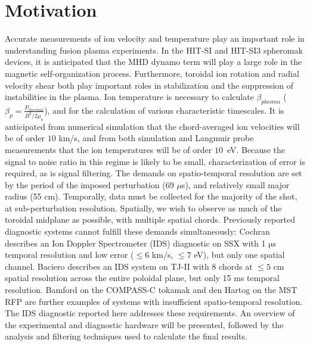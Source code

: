 \section{Motivation}
\hspace{4ex}Accurate measurements of ion velocity and temperature play an important role in understanding fusion plasma experiments. In the HIT-SI and HIT-SI3 spheromak devices, it is anticipated that the MHD dynamo term will play a large role in the magnetic self-organization process. Furthermore, toroidal ion rotation and radial velocity shear both play important roles in stabilization and the suppression of instabilities in the plasma. Ion temperature is necessary to calculate $\beta_{plasma}$ ($\beta_p = \frac{P_{thermal}}{B^2/2\mu_o}$), and for the calculation of various characteristic timescales. It is anticipated from numerical simulation\cite{akcay2013extended} that the chord-averaged ion velocities will be of order $10$ km/s, and from both simulation and Langmuir probe measurements that the ion temperatures will be of order $10$~eV. Because the signal to noise ratio in this regime is likely to be small, characterization of error is required, as is signal filtering. The demands on spatio-temporal resolution are set by the period of the imposed perturbation (69 $\mu$s), and relatively small major radius (55 cm). Temporally, data must be collected for the majority of the shot, at sub-perturbation resolution. Spatially, we wish to observe as much of the toroidal midplane as possible, with multiple spatial chords. Previously reported diagnostic systems cannot fulfill these demands simultaneously: Cochran \cite{cothran2006fast} describes an Ion Doppler Spectrometer (IDS) diagnostic on SSX with 1 $\mathrm{\mu}$s temporal resolution and low error ($\leq6$ km/s, $\leq7$ eV), but only one spatial channel. Baciero \cite{Baciero2001JT-II} describes an IDS system on TJ-II with 8 chords at $\leq5$ cm spatial resolution across the entire poloidal plane, but only 15 ms temporal resolution. Bamford \cite{bamford1992combination} on the COMPASS-C tokamak and den Hartog \cite{den1994fast} on the MST RFP are further examples of systems with insufficient spatio-temporal resolution. The IDS diagnostic reported here addresses these requirements. An overview of the experimental and diagnostic hardware will be presented, followed by the analysis and filtering techniques used to calculate the final results.



